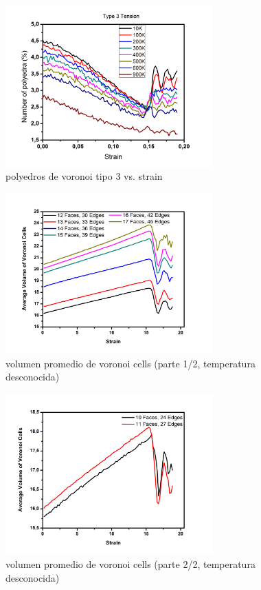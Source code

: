 \documentclass[10pt, oneside]{article} %
\begin{document}
\begin{figure}[H]
\centering
\includegraphics[width=8cm]{Figures/type3_TEN.png}
\caption{polyedros de voronoi tipo 3 vs. strain}
\end{figure}

\begin{figure}[H]
\centering
\includegraphics[width=8cm]{Figures/TRAC_Vol_Step_A.png}
\caption{volumen promedio de voronoi cells (parte 1/2, temperatura desconocida)}
\end{figure}

\begin{figure}[H]
\centering
\includegraphics[width=8cm]{Figures/TRAC_Vol_Step_B.png}
\caption{volumen promedio de voronoi cells (parte 2/2, temperatura desconocida)}
\end{figure}
\end{document}
